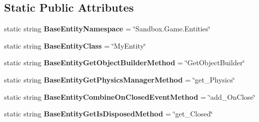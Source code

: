 \subsection*{Static Public Attributes}
\begin{DoxyCompactItemize}
\item 
\hypertarget{class_s_e_mod_a_p_i_internal_1_1_a_p_i_1_1_entity_1_1_base_entity_a281a60cc87896891677c756fd6b79952}{}static string {\bfseries Base\+Entity\+Namespace} = \char`\"{}Sandbox.\+Game.\+Entities\char`\"{}\label{class_s_e_mod_a_p_i_internal_1_1_a_p_i_1_1_entity_1_1_base_entity_a281a60cc87896891677c756fd6b79952}

\item 
\hypertarget{class_s_e_mod_a_p_i_internal_1_1_a_p_i_1_1_entity_1_1_base_entity_aeb038cad2626a56ad05499f1ab3f85b2}{}static string {\bfseries Base\+Entity\+Class} = \char`\"{}My\+Entity\char`\"{}\label{class_s_e_mod_a_p_i_internal_1_1_a_p_i_1_1_entity_1_1_base_entity_aeb038cad2626a56ad05499f1ab3f85b2}

\item 
\hypertarget{class_s_e_mod_a_p_i_internal_1_1_a_p_i_1_1_entity_1_1_base_entity_ada1ef5c67a5172e0f2f0be68ed36ff1c}{}static string {\bfseries Base\+Entity\+Get\+Object\+Builder\+Method} = \char`\"{}Get\+Object\+Builder\char`\"{}\label{class_s_e_mod_a_p_i_internal_1_1_a_p_i_1_1_entity_1_1_base_entity_ada1ef5c67a5172e0f2f0be68ed36ff1c}

\item 
\hypertarget{class_s_e_mod_a_p_i_internal_1_1_a_p_i_1_1_entity_1_1_base_entity_a774d66d7bc2ad32a83e65f9caf304c71}{}static string {\bfseries Base\+Entity\+Get\+Physics\+Manager\+Method} = \char`\"{}get\+\_\+\+Physics\char`\"{}\label{class_s_e_mod_a_p_i_internal_1_1_a_p_i_1_1_entity_1_1_base_entity_a774d66d7bc2ad32a83e65f9caf304c71}

\item 
\hypertarget{class_s_e_mod_a_p_i_internal_1_1_a_p_i_1_1_entity_1_1_base_entity_a062560320b22a7b7de44ab9045577462}{}static string {\bfseries Base\+Entity\+Combine\+On\+Closed\+Event\+Method} = \char`\"{}add\+\_\+\+On\+Close\char`\"{}\label{class_s_e_mod_a_p_i_internal_1_1_a_p_i_1_1_entity_1_1_base_entity_a062560320b22a7b7de44ab9045577462}

\item 
\hypertarget{class_s_e_mod_a_p_i_internal_1_1_a_p_i_1_1_entity_1_1_base_entity_a1fd2050cd2072af4f3be95261b5381c2}{}static string {\bfseries Base\+Entity\+Get\+Is\+Disposed\+Method} = \char`\"{}get\+\_\+\+Closed\char`\"{}\label{class_s_e_mod_a_p_i_internal_1_1_a_p_i_1_1_entity_1_1_base_entity_a1fd2050cd2072af4f3be95261b5381c2}


\end{DoxyCompactItemize}
